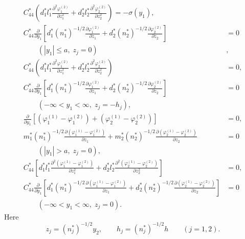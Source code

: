 \begin{align}
	\nonumber
	C_{44}^{*}\!\left(
	d_{1}^{*} l_{1}^{*} \frac{\partial^{2}\varphi_{1}^{(2)}}{\partial z_{1}^{2}}
	+
	d_{2}^{*} l_{2}^{*} \frac{\partial^{2}\varphi_{2}^{(2)}}{\partial z_{2}^{2}}
	\right)
	= -\sigma(y_{1}),&\\
	\nonumber
	C_{44}^{*}\frac{\partial}{\partial y_{1}}
	\left[
	d_{1}^{*}(n_{1}^{*})^{-1/2}\frac{\partial \varphi_{1}^{(2)}}{\partial z_{1}}
	+
	d_{2}^{*}(n_{2}^{*})^{-1/2}\frac{\partial \varphi_{2}^{(2)}}{\partial z_{2}}
	\right]
	&=0\\
	\nonumber
	\qquad (|y_{1}|\le a,\; z_{j}=0)&,\\
	\nonumber
	C_{44}^{*}\!\left(
	d_{1}^{*} l_{1}^{*} \frac{\partial^{2}\varphi_{1}^{(2)}}{\partial z_{1}^{2}}
	+
	d_{2}^{*} l_{2}^{*} \frac{\partial^{2}\varphi_{2}^{(2)}}{\partial z_{2}^{2}}
	\right)
	&=0,\\
	\label{BogdanovGuzEq19}
	C_{44}^{*}\frac{\partial}{\partial y_{1}}
	\left[
	d_{1}^{*}(n_{1}^{*})^{-1/2}\frac{\partial \varphi_{1}^{(2)}}{\partial z_{1}}
	+
	d_{2}^{*}(n_{2}^{*})^{-1/2}\frac{\partial \varphi_{2}^{(2)}}{\partial z_{2}}
	\right]
	&=0\\
	\nonumber
	\qquad (-\infty<y_{1}<\infty,\; z_{j}=-h_{j}),&\\
	\nonumber
	\frac{\partial}{\partial y_{1}}
	\left[
	(\varphi_{1}^{(1)}-\varphi_{1}^{(2)})
	+
	(\varphi_{2}^{(1)}-\varphi_{2}^{(2)})
	\right]
	&=0,\\
	\nonumber
	m_{1}^{*}(n_{1}^{*})^{-1/2}
	\frac{\partial(\varphi_{1}^{(1)}-\varphi_{1}^{(2)})}{\partial z_{1}}
	+
	m_{2}^{*}(n_{2}^{*})^{-1/2}
	\frac{\partial(\varphi_{2}^{(1)}-\varphi_{2}^{(2)})}{\partial z_{2}}
	&=0\\
	\nonumber
	\qquad (|y_{1}|>a,\; z_{j}=0),&\\
	\nonumber
	C_{44}^{*}\!\left[
	d_{1}^{*}l_{1}^{*}
	\frac{\partial^{2}(\varphi_{1}^{(1)}-\varphi_{1}^{(2)})}{\partial z_{1}^{2}}
	+
	d_{2}^{*}l_{2}^{*}
	\frac{\partial^{2}(\varphi_{2}^{(1)}-\varphi_{2}^{(2)})}{\partial z_{2}^{2}}
	\right]
	&=0,\\
	\nonumber
	C_{44}^{*}\frac{\partial}{\partial y_{1}}
	\left[
	d_{1}^{*}(n_{1}^{*})^{-1/2}
	\frac{\partial(\varphi_{1}^{(1)}-\varphi_{1}^{(2)})}{\partial z_{1}}
	+
	d_{2}^{*}(n_{2}^{*})^{-1/2}
	\frac{\partial(\varphi_{2}^{(1)}-\varphi_{2}^{(2)})}{\partial z_{2}}
	\right]
	&=0\\
	\nonumber
	\qquad (-\infty<y_{1}<\infty,\; z_{j}=0).&
\end{align}
%
Here
\[
z_{j}=(n_{j}^{*})^{-1/2}y_{2}, 
\qquad 
h_{j}=(n_{j}^{*})^{-1/2}h
\qquad (j=1,2).
\]


